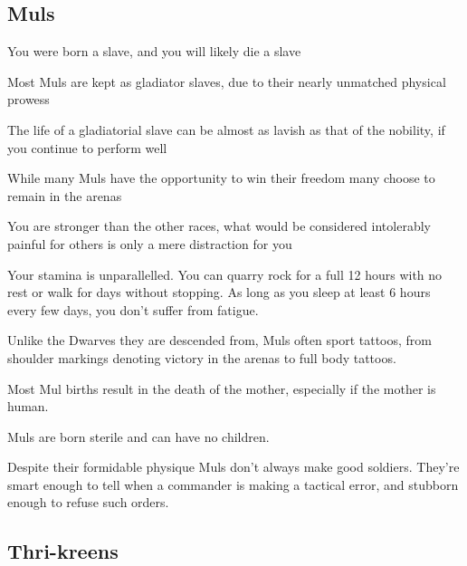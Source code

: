 \begin{multicols}{2}
\subsection{Muls}

\begin{description}
    \item You were born a slave, and you will likely die a slave
    \item Most Muls are kept as gladiator slaves, due to their nearly unmatched physical prowess
    \item The life of a gladiatorial slave can be almost as lavish as that of the nobility, if you continue to perform well
    \item While many Muls have the opportunity to win their freedom many choose to remain in the arenas
    \item You are stronger than the other races, what would be considered intolerably painful for others is only a mere distraction for you
    \item Your stamina is unparallelled. You can quarry rock for a full 12 hours with no rest or walk for days without stopping. As long as you sleep at least 6 hours every few days, you don’t suffer from fatigue.
    \item Unlike the Dwarves they are descended from, Muls often sport tattoos, from shoulder markings denoting victory in the arenas to full body tattoos.
    \item Most Mul births result in the death of the mother, especially if the mother is human.
    \item Muls are born sterile and can have no children.
    \item Despite their formidable physique Muls don’t always make good soldiers. They’re smart enough to tell when a commander is making a tactical error, and stubborn enough to refuse such orders.
\end{description}

\subsection{Thri-kreens}


\end{multicols}
